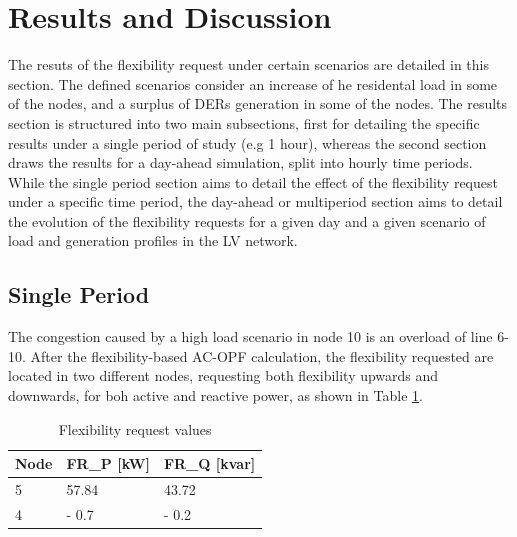 \section{Results and Discussion}
The resuts of the flexibility request under certain scenarios are detailed in this section. The defined scenarios consider an increase of he residental load in some of the nodes, and a surplus of DERs generation in some of the nodes. The results section is structured into two main subsections, first for detailing the specific results under a single period of study (e.g 1 hour), whereas the second section draws the results for a day-ahead simulation, split into hourly time periods. While the single period section aims to detail the effect of the flexibility request under a specific time period, the day-ahead or multiperiod section aims to detail the evolution of the flexibility requests for a given day and a given scenario of load and generation profiles in the LV network. 
\subsection{Single Period}
The congestion caused by a high load scenario in node 10 is an overload of line 6-10. After the flexibility-based AC-OPF calculation, the flexibility requested are located in two different nodes, requesting both flexibility upwards and downwards, for boh active and reactive power, as shown in Table \ref{tab:FR_case1}. 

\begin{table}[htbp]
\centering
\caption{Flexibility request values}
\label{tab:FR_case1}
\begin{tabular}{lll} 
\toprule
Node & FR\_P [kW] & FR\_Q [kvar]  \\ 
\hline
5    & 57.84      & 43.72         \\
4    & - 0.7      & - 0.2         \\
\bottomrule
\end{tabular}
\end{table}

